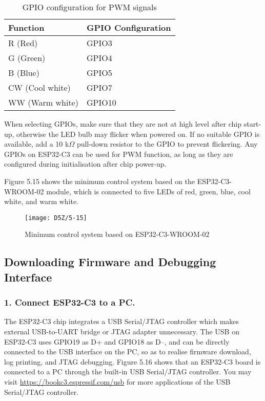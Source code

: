 \documentclass[a4paper,12pt]{book}
\begin{document}
\begin{table}[h!]
    \renewcommand{\arraystretch}{1.4}
    \caption{GPIO configuration for PWM signals}
    \begin{tabular}{|>{\Centering}m{}|>{\Centering}m{}|}
        \hline
        \rowcolor{LightBlue} \textbf{Function}&\textbf{GPIO Configuration}\\
        \hline
        R (Red)&GPIO3\\
        \hline
        G (Green)&GPIO4\\
        \hline
        B (Blue)&GPIO5\\
        \hline
        CW (Cool white)&GPIO7\\
        \hline
        WW (Warm white)&GPIO10\\
        \hline
    \end{tabular}
\end{table}

When selecting GPIOs, make sure that they are not at high level after chip start-up, otherwise the LED bulb may flicker when powered on. If no suitable GPIO is available, add a 10 k$\Omega$ pull-down resistor to the GPIO to prevent flickering. Any GPIOs on ESP32-C3 can be used for PWM function, as long as they are configured during initialisation after chip power-up.

Figure 5.15 shows the minimum control system based on the ESP32-C3-WROOM-02 module, which is connected to five LEDs of red, green, blue, cool white, and warm white.

\begin{figure}[h!]
    \centering
    \texttt{[image: D5Z/5-15]}
    \caption{Minimum control system based on ESP32-C3-WROOM-02}
\end{figure}

\subsection{Downloading Firmware and Debugging Interface}
\subsubsection{1. Connect ESP32-C3 to a PC.}
The ESP32-C3 chip integrates a USB Serial/JTAG controller which makes external USB-to-UART bridge or JTAG adapter unnecessary. The USB on ESP32-C3 uses GPIO19 as D+ and GPIO18 as D--, and can be directly connected to the USB interface on the PC, so as to realise firmware download, log printing, and JTAG debugging. Figure 5.16 shows that an ESP32-C3 board is connected to a PC through the built-in USB Serial/JTAG controller. You may visit \url{https://bookc3.espressif.com/usb} for more applications of the USB Serial/JTAG controller.
\end{document}
